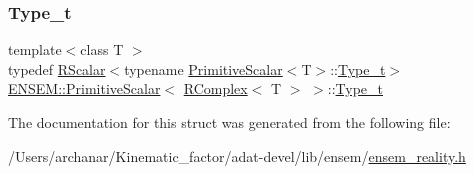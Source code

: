 \subsubsection{\texorpdfstring{Type\_t}{Type\_t}\hspace{0.1cm}{\footnotesize\ttfamily [3/3]}}
{\footnotesize\ttfamily template$<$class T $>$ \\
typedef \mbox{\hyperlink{classENSEM_1_1RScalar}{R\+Scalar}}$<$typename \mbox{\hyperlink{structENSEM_1_1PrimitiveScalar}{Primitive\+Scalar}}$<$T$>$\+::\mbox{\hyperlink{structENSEM_1_1PrimitiveScalar_3_01RComplex_3_01T_01_4_01_4_ad770c97f1555b5a3cd1a0f563d4ba782}{Type\+\_\+t}}$>$ \mbox{\hyperlink{structENSEM_1_1PrimitiveScalar}{E\+N\+S\+E\+M\+::\+Primitive\+Scalar}}$<$ \mbox{\hyperlink{classENSEM_1_1RComplex}{R\+Complex}}$<$ T $>$ $>$\+::\mbox{\hyperlink{structENSEM_1_1PrimitiveScalar_3_01RComplex_3_01T_01_4_01_4_ad770c97f1555b5a3cd1a0f563d4ba782}{Type\+\_\+t}}}



The documentation for this struct was generated from the following file\+:\begin{DoxyCompactItemize}
\item 
/\+Users/archanar/\+Kinematic\+\_\+factor/adat-\/devel/lib/ensem/\mbox{\hyperlink{adat-devel_2lib_2ensem_2ensem__reality_8h}{ensem\+\_\+reality.\+h}}\end{DoxyCompactItemize}
